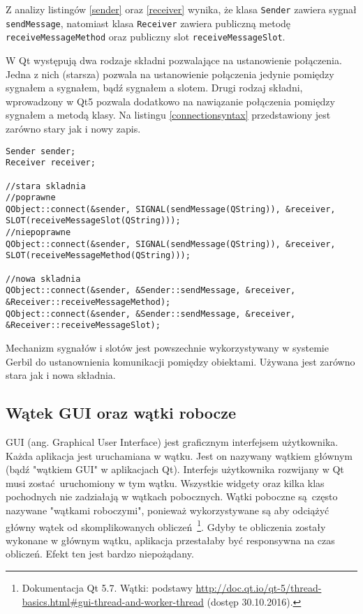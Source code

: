 Z analizy listingów \ref{sender} oraz \ref{receiver} wynika, że klasa \lstinline{Sender} zawiera sygnał \lstinline{sendMessage}, natomiast klasa \lstinline{Receiver} zawiera publiczną metodę \lstinline{receiveMessageMethod} oraz publiczny slot \lstinline{receiveMessageSlot}.

W Qt występują dwa rodzaje składni pozwalające na ustanowienie połączenia. Jedna z nich (starsza) pozwala na ustanowienie połączenia jedynie pomiędzy sygnałem a sygnałem, bądź sygnałem a slotem. Drugi rodzaj składni, wprowadzony w Qt5 pozwala dodatkowo na nawiązanie połączenia pomiędzy sygnałem a metodą klasy. Na listingu \ref{connectionsyntax} przedstawiony jest zarówno stary jak i nowy zapis.

\begin{minipage}{\textwidth}

	\begin{lstlisting}[label=connectionsyntax, caption={Składnia tworzenia połączeń między obiektami},alsoletter={()[].=}]
Sender sender;
Receiver receiver;

//stara skladnia
//poprawne
QObject::connect(&sender, SIGNAL(sendMessage(QString)), &receiver, SLOT(receiveMessageSlot(QString)));
//niepoprawne
QObject::connect(&sender, SIGNAL(sendMessage(QString)), &receiver, SLOT(receiveMessageMethod(QString)));

//nowa skladnia
QObject::connect(&sender, &Sender::sendMessage, &receiver, &Receiver::receiveMessageMethod);
QObject::connect(&sender, &Sender::sendMessage, &receiver, &Receiver::receiveMessageSlot);
	\end{lstlisting}
\end{minipage}

Mechanizm sygnałów i slotów jest powszechnie wykorzystywany w systemie Gerbil do ustanownienia komunikacji pomiędzy obiektami. Używana jest zarówno stara jak i nowa składnia.

\subsection{Wątek GUI oraz wątki robocze}
GUI (ang. Graphical User Interface) jest graficznym interfejsem użytkownika. Każda aplikacja jest uruchamiana w wątku. Jest on nazywany wątkiem głównym (bądź "wątkiem GUI" w aplikacjach Qt). Interfejs użytkownika rozwijany w Qt musi zostać uruchomiony w tym wątku. Wszystkie widgety oraz kilka klas pochodnych nie zadziałają w wątkach pobocznych. Wątki poboczne są często nazywane "wątkami roboczymi", ponieważ wykorzystywane są aby odciążyć główny wątek od skomplikowanych obliczeń~\footnote{Dokumentacja Qt 5.7. Wątki: podstawy \url{http://doc.qt.io/qt-5/thread-basics.html\#gui-thread-and-worker-thread} (dostęp 30.10.2016).}. Gdyby te obliczenia zostały wykonane w głównym wątku, aplikacja przestałaby być responsywna na czas obliczeń. Efekt ten jest bardzo niepożądany.

